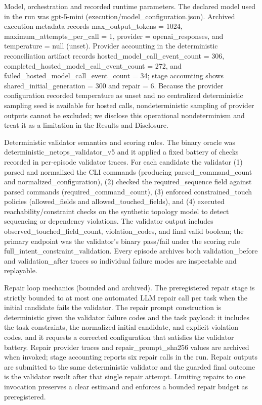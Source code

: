 \documentclass[conference]{IEEEtran}
\begin{document}
Model, orchestration and recorded runtime parameters.  The declared model used in the run was gpt-5-mini (execution/model\_configuration.json). Archived execution metadata records max\_output\_tokens = 1024, maximum\_attempts\_per\_call = 1, provider = openai\_responses, and temperature = null (unset). Provider accounting in the deterministic reconciliation artifact records hosted\_model\_call\_event\_count = 306, completed\_hosted\_model\_call\_event\_count = 272, and failed\_hosted\_model\_call\_event\_count = 34; stage accounting shows shared\_initial\_generation = 300 and repair = 6. Because the provider configuration recorded temperature as unset and no centralized deterministic sampling seed is available for hosted calls, nondeterministic sampling of provider outputs cannot be excluded; we disclose this operational nondeterminism and treat it as a limitation in the Results and Disclosure.

Deterministic validator semantics and scoring rules.  The binary oracle was deterministic\_netops\_validator\_v5 and it applied a fixed battery of checks recorded in per‑episode validator traces. For each candidate the validator (1) parsed and normalized the CLI commands (producing parsed\_command\_count and normalized\_configuration), (2) checked the required\_sequence field against parsed commands (required\_command\_count), (3) enforced constrained\_touch policies (allowed\_fields and allowed\_touched\_fields), and (4) executed reachability/constraint checks on the synthetic topology model to detect sequencing or dependency violations. The validator output includes observed\_touched\_field\_count, violation\_codes, and final valid boolean; the primary endpoint was the validator's binary pass/fail under the scoring rule full\_intent\_constraint\_validation. Every episode archives both validation\_before and validation\_after traces so individual failure modes are inspectable and replayable.

Repair loop mechanics (bounded and archived).  The preregistered repair stage is strictly bounded to at most one automated LLM repair call per task when the initial candidate fails the validator. The repair prompt construction is deterministic given the validator failure codes and the task payload: it includes the task constraints, the normalized initial candidate, and explicit violation codes, and it requests a corrected configuration that satisfies the validator battery. Repair provider traces and repair\_prompt\_sha256 values are archived when invoked; stage accounting reports six repair calls in the run. Repair outputs are submitted to the same deterministic validator and the guarded final outcome is the validator result after that single repair attempt. Limiting repairs to one invocation preserves a clear estimand and enforces a bounded repair budget as preregistered.
\end{document}
